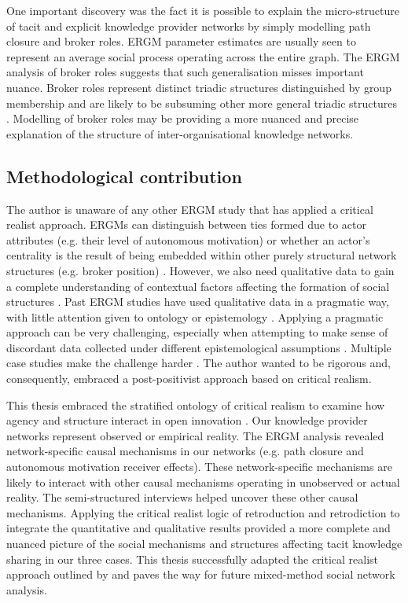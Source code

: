 One important discovery was the fact it is possible to explain the micro-structure of tacit and explicit knowledge provider networks by simply modelling path closure and broker roles. ERGM parameter estimates are usually seen to represent an average social process operating across the entire graph. The ERGM analysis of broker roles suggests that such generalisation misses important nuance. Broker roles represent distinct triadic structures distinguished by group membership and are likely to be subsuming other more general triadic structures \citep{gould1989structures}. Modelling of broker roles may be providing a more nuanced and precise explanation of the structure of inter-organisational knowledge networks. 

\subsection{Methodological contribution}

The author is unaware of any other ERGM study that has applied a critical realist approach. ERGMs can distinguish between ties formed due to actor attributes (e.g. their level of autonomous motivation) or whether an actor's centrality is the result of being embedded within other purely structural network structures (e.g. broker position) \citep{lusher2020advances}. However, we also need qualitative data to gain a complete understanding of contextual factors affecting the formation of social structures \citep{welch2011theorising,bellotti2014qualitative}. Past ERGM studies have used qualitative data in a pragmatic way, with little attention given to ontology or epistemology \citep[e.g.][]{lomi2014network, lusher2012trust, matous2019external,barnes2020social}. Applying a pragmatic approach can be very challenging, especially when attempting to make sense of discordant data collected under different epistemological assumptions \citep{johnson2004mixed, giddings2006mixed, shannon2016making}. Multiple case studies make the challenge harder \citep{welch2011theorising}. The author wanted to be rigorous and, consequently, embraced a post-positivist approach based on critical realism. \medskip

This thesis embraced the stratified ontology of critical realism to examine how agency and structure interact in open innovation \citep{bhaskar2013realist}. Our knowledge provider networks represent observed or empirical reality. The ERGM analysis revealed network-specific causal mechanisms in our networks (e.g. path closure and autonomous motivation receiver effects). These network-specific mechanisms are likely to interact with other causal mechanisms operating in unobserved or actual reality. The semi-structured interviews helped uncover these other causal mechanisms. Applying the critical realist logic of retroduction and retrodiction to integrate the quantitative and qualitative results provided a more complete and nuanced picture of the social mechanisms and structures affecting tacit knowledge sharing in our three cases. This thesis successfully adapted the critical realist approach outlined by \citet{mcavoy2018critical} and paves the way for future mixed-method social network analysis. \medskip

